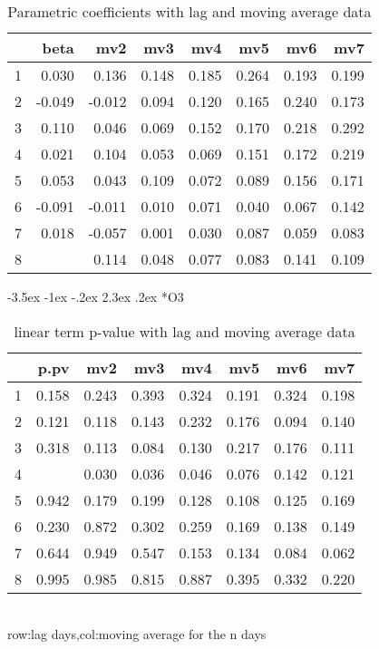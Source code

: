 \documentclass[a4paper, 12pt]{article}
\makeatletter
\def\large{\fontsize{14}{20}\selectfont}
\renewcommand\subsection{\@startsection {subsection}{1}{\z@}%
                                   {-3.5ex \@plus -1ex \@minus -.2ex}%
                                   {2.3ex \@plus.2ex}%
                                   {\centering\normalfont\large\bfseries}}
\makeatother
\begin{document}
\begin{table}[h]
\centering
\caption{Parametric coefficients with lag and moving average data}
\begin{tabular}{rrrrrrrr}
  \hline
 & beta & mv2 & mv3 & mv4 & mv5 & mv6 & mv7 \\
  \hline
1 & 0.030 & 0.136 & 0.148 & 0.185 & 0.264 & 0.193 & 0.199 \\
  2 & -0.049 & -0.012 & 0.094 & 0.120 & 0.165 & 0.240 & 0.173 \\
  3 & 0.110 & 0.046 & 0.069 & 0.152 & 0.170 & 0.218 & 0.292 \\
  4 & 0.021 & 0.104 & 0.053 & 0.069 & 0.151 & 0.172 & 0.219 \\
  5 & 0.053 & 0.043 & 0.109 & 0.072 & 0.089 & 0.156 & 0.171 \\
  6 & -0.091 & -0.011 & 0.010 & 0.071 & 0.040 & 0.067 & 0.142 \\
  7 & 0.018 & -0.057 & 0.001 & 0.030 & 0.087 & 0.059 & 0.083 \\
  8 & \color{red}{0.126} & 0.114 & 0.048 & 0.077 & 0.083 & 0.141 & 0.109 \\
   \hline
\end{tabular}
\end{table}
\clearpage
\subsection*{O3}
\begin{table}[h]
\centering
\caption{linear term p-value with lag and moving average data}
\begin{tabular}{rrrrrrrr}
  \hline
 & p.pv & mv2 & mv3 & mv4 & mv5 & mv6 & mv7 \\
  \hline
1 & 0.158 & 0.243 & 0.393 & 0.324 & 0.191 & 0.324 & 0.198 \\
  2 & 0.121 & 0.118 & 0.143 & 0.232 & 0.176 & 0.094 & 0.140 \\
  3 & 0.318 & 0.113 & 0.084 & 0.130 & 0.217 & 0.176 & 0.111 \\
  4 & \color{red}{0.006} & 0.030 & 0.036 & 0.046 & 0.076 & 0.142 & 0.121 \\
  5 & 0.942 & 0.179 & 0.199 & 0.128 & 0.108 & 0.125 & 0.169 \\
  6 & 0.230 & 0.872 & 0.302 & 0.259 & 0.169 & 0.138 & 0.149 \\
  7 & 0.644 & 0.949 & 0.547 & 0.153 & 0.134 & 0.084 & 0.062 \\
  8 & 0.995 & 0.985 & 0.815 & 0.887 & 0.395 & 0.332 & 0.220 \\
   \hline
\end{tabular}
\\row:lag days,col:moving average for the n days
\end{table}
\end{document}
